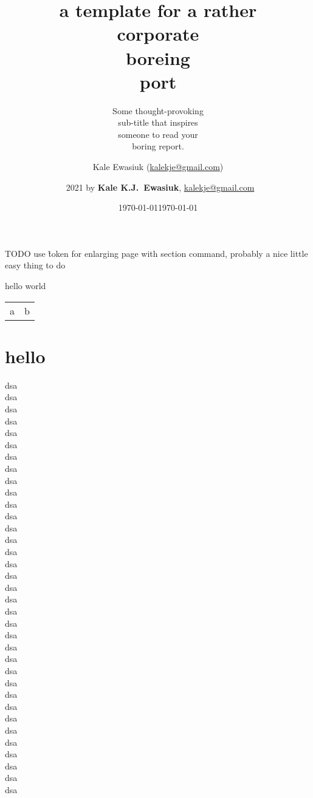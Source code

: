 \documentclass{corpboreport}
\author{Kale Ewasiuk (\url{kalekje@gmail.com})}
\date{\today}
\title{a template for a rather \\[0.2ex]
corp{\smaller\smaller\normalfont orate} \\
bore{\smaller\smaller\normalfont ing} \\
\leavevmode\llap{{\smaller\smaller\normalfont re}}port \\[0.1ex]
}
\author{\textcopyright\ 2021 by {\bfseries Kale K.J.\ Ewasiuk}, \url{kalekje@gmail.com}}
\subtitle{%
		Some thought-provoking\\
		sub-title that inspires\\
		someone to read your\\
		boring report.
}
\date{\today}
\begin{document}
	TODO use \~ token for enlarging page with section command, probably a nice little easy thing to do



	\begin{LTXexample}
		hello world

		\begin{tabular}{ l l }
			a & b \\
		\end{tabular}
	\end{LTXexample}

\maketitle


\IntentionallyBlankPage

\section{hello}

	dsa\\dsa\\dsa\\dsa\\dsa\\dsa\\dsa\\dsa\\dsa\\dsa\\dsa\\dsa\\dsa\\dsa\\
	dsa\\dsa\\dsa\\dsa\\dsa\\dsa\\dsa\\dsa\\dsa\\dsa\\dsa\\dsa\\dsa\\dsa\\
	dsa\\dsa\\dsa\\
	dsa\\dsa\\dsa\\
	dsa\\
\end{document}
